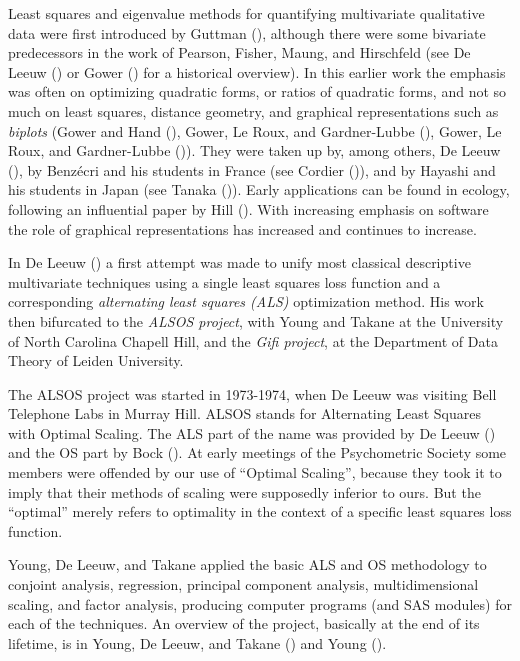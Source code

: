 \documentclass[
  12pt,
  letterpaper,
]{scrbook}
\begin{document}
Least squares and eigenvalue methods for quantifying multivariate
qualitative data were first introduced by Guttman
(), although there were some bivariate
predecessors in the work of Pearson, Fisher, Maung, and Hirschfeld (see
De Leeuw () or Gower
() for a historical overview). In this
earlier work the emphasis was often on optimizing quadratic forms, or
ratios of quadratic forms, and not so much on least squares, distance
geometry, and graphical representations such as \emph{biplots} (Gower
and Hand (), Gower, Le Roux, and
Gardner-Lubbe (),
Gower, Le Roux, and Gardner-Lubbe
()). They were taken up
by, among others, De Leeuw (), by
Benzécri and his students in France (see Cordier
()), and by Hayashi and his students in
Japan (see Tanaka ()). Early applications
can be found in ecology, following an influential paper by Hill
(). With increasing emphasis on software the
role of graphical representations has increased and continues to
increase.

In De Leeuw () a first attempt was made
to unify most classical descriptive multivariate techniques using a
single least squares loss function and a corresponding \emph{alternating
least squares (ALS)} optimization method. His work then bifurcated to
the \emph{ALSOS project}, with Young and Takane at the University of
North Carolina Chapell Hill, and the \emph{Gifi project}, at the
Department of Data Theory of Leiden University.

The ALSOS project was started in 1973-1974, when De Leeuw was visiting
Bell Telephone Labs in Murray Hill. ALSOS stands for Alternating Least
Squares with Optimal Scaling. The ALS part of the name was provided by
De Leeuw () and the OS part by Bock
(). At early meetings of the Psychometric
Society some members were offended by our use of ``Optimal Scaling'',
because they took it to imply that their methods of scaling were
supposedly inferior to ours. But the ``optimal'' merely refers to
optimality in the context of a specific least squares loss function.

Young, De Leeuw, and Takane applied the basic ALS and OS methodology to
conjoint analysis, regression, principal component analysis,
multidimensional scaling, and factor analysis, producing computer
programs (and SAS modules) for each of the techniques. An overview of
the project, basically at the end of its lifetime, is in Young, De
Leeuw, and Takane () and
Young ().
\end{document}
